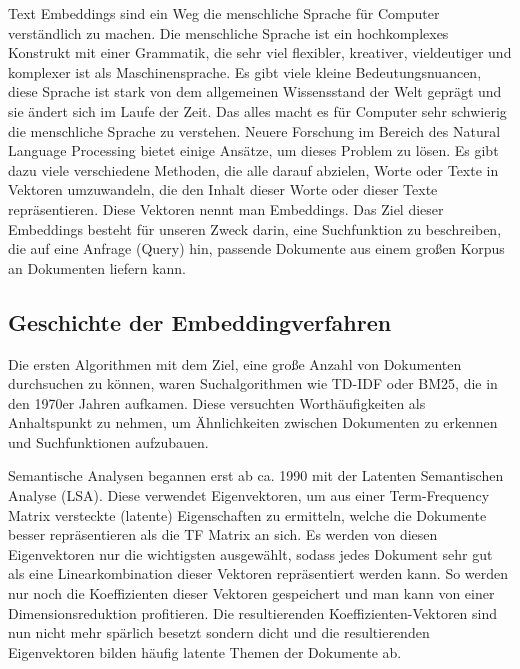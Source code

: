 Text Embeddings sind ein Weg die menschliche Sprache für Computer verständlich zu machen. 
Die menschliche Sprache ist ein hochkomplexes Konstrukt mit einer Grammatik, die sehr viel flexibler, kreativer, vieldeutiger und komplexer ist als Maschinensprache. 
Es gibt viele kleine Bedeutungsnuancen, diese Sprache ist stark von dem allgemeinen Wissensstand der Welt geprägt und sie ändert sich im Laufe der Zeit. 
Das alles macht es für Computer sehr schwierig die menschliche Sprache zu verstehen. 
Neuere Forschung im Bereich des Natural Language Processing bietet einige Ansätze, um dieses Problem zu lösen. 
Es gibt dazu viele verschiedene Methoden, die alle darauf abzielen, Worte oder Texte in Vektoren umzuwandeln, die den Inhalt dieser Worte oder dieser Texte repräsentieren.
Diese Vektoren nennt man Embeddings.
Das Ziel dieser Embeddings besteht für unseren Zweck darin, eine Suchfunktion zu beschreiben, die auf eine Anfrage (Query) hin, passende Dokumente aus einem großen Korpus an Dokumenten liefern kann.

\subsection{Geschichte der Embeddingverfahren}

Die ersten Algorithmen mit dem Ziel, eine große Anzahl von Dokumenten durchsuchen zu können, waren Suchalgorithmen wie TD-IDF oder BM25, die in den 1970er Jahren aufkamen.
Diese versuchten Worthäufigkeiten als Anhaltspunkt zu nehmen, um Ähnlichkeiten zwischen Dokumenten zu erkennen und Suchfunktionen aufzubauen. 

Semantische Analysen begannen erst ab ca. 1990 mit der Latenten Semantischen Analyse (LSA).
Diese verwendet Eigenvektoren, um aus einer Term-Frequency Matrix versteckte (latente) Eigenschaften zu ermitteln, welche die Dokumente besser repräsentieren als die TF Matrix an sich. 
Es werden von diesen Eigenvektoren nur die wichtigsten ausgewählt, sodass jedes Dokument sehr gut als eine Linearkombination dieser Vektoren repräsentiert werden kann.
So werden nur noch die Koeffizienten dieser Vektoren gespeichert und man kann von einer Dimensionsreduktion profitieren.
Die resultierenden Koeffizienten-Vektoren sind nun nicht mehr spärlich besetzt sondern dicht und die resultierenden Eigenvektoren bilden häufig latente Themen der Dokumente ab.

